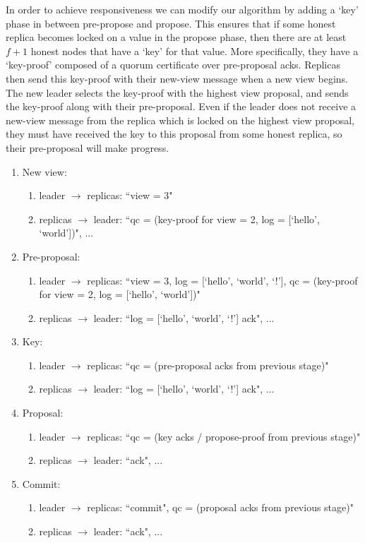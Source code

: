 \documentclass[a4paper]{article}
\begin{document}
In order to achieve responsiveness we can modify our algorithm by adding a `key' phase in between pre-propose and propose. This ensures that if some honest replica becomes locked on a value in the propose phase, then there are at least $f + 1$ honest nodes that have a `key' for that value. More specifically, they have a `key-proof' composed of a quorum certificate over pre-proposal acks. Replicas then send this key-proof with their new-view message when a new view begins. The new leader selects the key-proof with the highest view proposal, and sends the key-proof along with their pre-proposal. Even if the leader does not receive a new-view message from the replica which is locked on the highest view proposal, they must have received the key to this proposal from some honest replica, so their pre-proposal will make progress.

\begin{enumerate}
\item New view: 
	\begin{enumerate}
	\item leader $\to$ replicas: ``view = 3" 
	\item replicas $\to$ leader: ``qc = (key-proof for view = 2, log = [`hello', `world'])", ...
	\end{enumerate}
\item Pre-proposal:
	\begin{enumerate}
	\item leader $\to$ replicas: ``view = 3, log = [`hello', `world', `!'], qc = (key-proof for view = 2, log = [`hello', `world'])"
	\item replicas $\to$ leader: ``log = [`hello', `world', `!'] ack", ...
	\end{enumerate}
\item Key:
	\begin{enumerate}
	\item leader $\to$ replicas: ``qc = (pre-proposal acks from previous stage)"
	\item replicas $\to$ leader: ``log = [`hello', `world', `!'] ack", ...
	\end{enumerate}

\item Proposal:
	\begin{enumerate}
	\item leader $\to$ replicas: ``qc = (key acks / propose-proof from previous stage)"
	\item replicas $\to$ leader: ``ack", ...
	\end{enumerate}
\item Commit:
	\begin{enumerate}
	\item leader $\to$ replicas: ``commit", qc = (proposal acks from previous stage)"
	\item replicas $\to$ leader: ``ack", ...
	\end{enumerate}
\end{enumerate}



\end{document}
